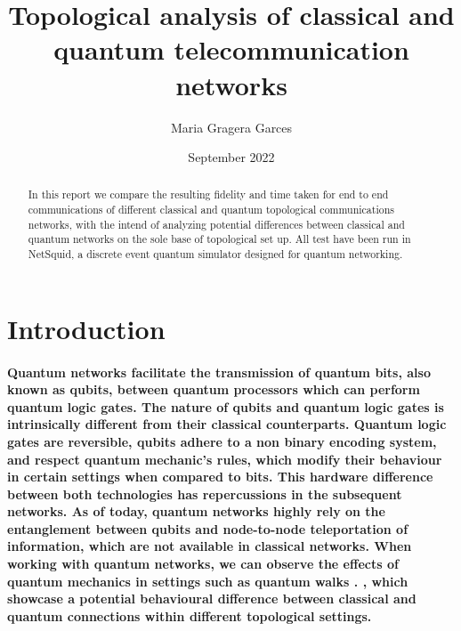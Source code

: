 \documentclass{article}
\begin{document}
    
\title{Topological analysis of classical and quantum telecommunication networks}
\author{Maria Gragera Garces}

\date{September 2022}

\maketitle

\begin{abstract}
    In this report we compare the resulting fidelity and time taken for end to end communications of different classical and quantum topological communications networks, with the intend of analyzing potential differences between classical and quantum networks on the sole base of topological set up.
    All test have been run in NetSquid, a discrete event quantum simulator designed for quantum networking.
\end{abstract}

    \section{Introduction}

    \paragraph{Quantum networks facilitate the transmission of quantum bits, also known as qubits, between quantum processors which can perform quantum logic gates.
    The nature of qubits and quantum logic gates is intrinsically different from their classical counterparts. Quantum logic gates are reversible, qubits adhere to a non binary encoding system, and respect quantum mechanic's rules, which modify their behaviour in certain settings when compared to bits.
    This hardware difference between both technologies has repercussions in the subsequent networks. As of today, quantum networks highly rely on the entanglement between qubits and node-to-node teleportation of information, which are not available in classical networks.
    When working with quantum networks, we can observe the effects of quantum mechanics in settings such as quantum walks \cite{Quantumwalks}. , which showcase a potential behavioural difference between classical and quantum connections within different topological settings.}
\end{document}
